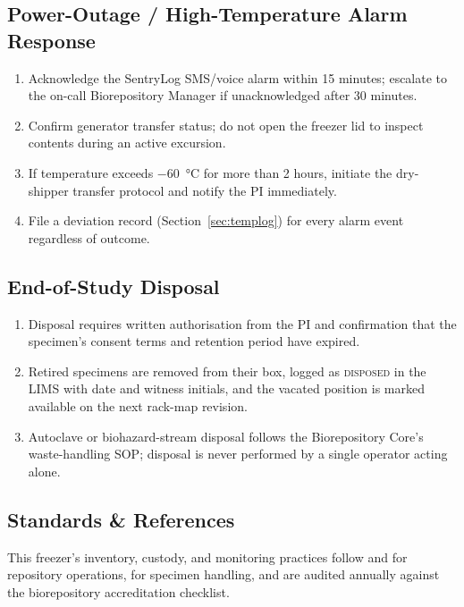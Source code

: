 \subsection{Power-Outage / High-Temperature Alarm Response}
\begin{enumerate}[label=\arabic*., itemsep=2pt, topsep=4pt]
  \item Acknowledge the SentryLog SMS/voice alarm within 15 minutes; escalate to the on-call
        Biorepository Manager if unacknowledged after 30 minutes.
  \item Confirm generator transfer status; do not open the freezer lid to inspect contents
        during an active excursion.
  \item If temperature exceeds \SI{-60}{\celsius} for more than 2 hours, initiate the
        dry-shipper transfer protocol and notify the PI immediately.
  \item File a deviation record (Section~\ref{sec:templog}) for every alarm event regardless
        of outcome.
\end{enumerate}

\subsection{End-of-Study Disposal}
\begin{enumerate}[label=\arabic*., itemsep=2pt, topsep=4pt]
  \item Disposal requires written authorisation from the PI and confirmation that the
        specimen's consent terms and retention period have expired.
  \item Retired specimens are removed from their box, logged as \textsc{disposed} in the LIMS
        with date and witness initials, and the vacated position is marked available on the
        next rack-map revision.
  \item Autoclave or biohazard-stream disposal follows the Biorepository Core's waste-handling
        SOP; disposal is never performed by a single operator acting alone.
\end{enumerate}

\subsection{Standards \& References}
This freezer's inventory, custody, and monitoring practices follow
\citet{isber2023} and \citet{nih2016} for repository operations,
\citet{clsi2010} for specimen handling, and are audited annually against the
\citet{cap2022} biorepository accreditation checklist.

